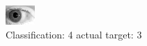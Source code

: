 \begin{figure}[h!]
\begin{center}
\includegraphics[width=0.60\columnwidth]{figures/ID271_class_4_target_3.png}
\end{center}
\caption{ Classification: 4 actual target: 3}
\label{fig:ID271_class_4_target_3}
\end{figure}
